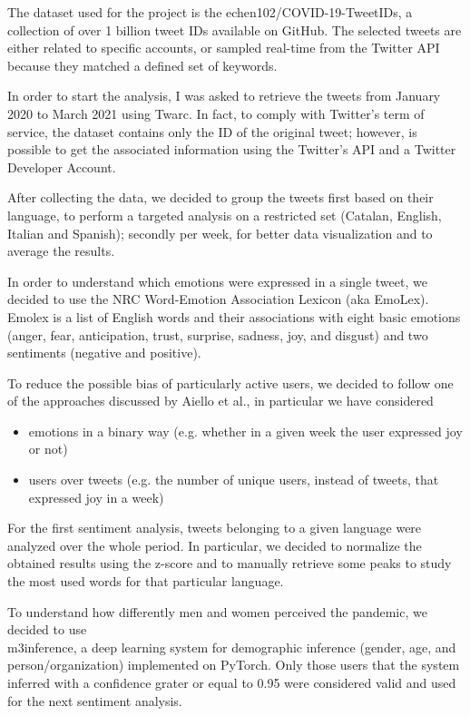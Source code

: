 The dataset used for the project is the echen102/COVID-19-TweetIDs, a collection of over 1 billion tweet IDs available on GitHub. The selected tweets are either related to specific accounts, or sampled real-time from the Twitter API because they matched a defined set of keywords.

In order to start the analysis, I was asked to retrieve the tweets from January 2020 to March 2021 using Twarc. In fact, to comply with Twitter's term of service, the dataset contains only the ID of the original tweet; however, is possible to get the associated information using the Twitter's API and a Twitter Developer Account.

After collecting the data, we decided to group the tweets first based on their language, to perform a targeted analysis on a restricted set (Catalan, English, Italian and Spanish); secondly per week, for better data visualization and to average the results.

In order to understand which emotions were expressed in a single tweet, we decided to use the NRC Word-Emotion Association Lexicon (aka EmoLex). Emolex is a list of English words and their associations with eight basic emotions (anger, fear, anticipation, trust, surprise, sadness, joy, and disgust) and two sentiments (negative and positive).

To reduce the possible bias of particularly active users, we decided to follow one of the approaches discussed by Aiello et al., in particular we have considered
	
\begin{itemize}
	\item emotions in a binary way (e.g. whether in a given week the user expressed joy or not)
	\item users over tweets (e.g. the number of unique users, instead of tweets, that expressed joy in a week)
\end{itemize}

For the first sentiment analysis, tweets belonging to a given language were analyzed over the whole period. In particular, we decided to normalize the obtained results using the z-score and to manually retrieve some peaks to study the most used words for that particular language.

To understand how differently men and women perceived the pandemic, we decided to use\\ m3inference, a deep learning system for demographic inference (gender, age, and person/organization) implemented on PyTorch. Only those users that the system inferred with a confidence grater or equal to 0.95 were considered valid and used for the next sentiment analysis.

